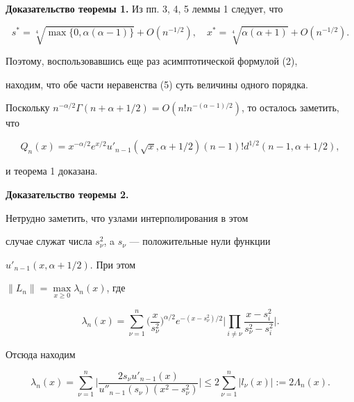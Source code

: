 {\bf Доказательство теоремы 1.} Из пп. 3, 4, 5 леммы 1 следует, что


$$


s^\ast=\sqrt[4]{\max\{0,\alpha(\alpha-1)\}}+O(n^{-1/2}),\quad


x^\ast=\sqrt[4]{\alpha(\alpha+1)}+O(n^{-1/2}).


$$


Поэтому, воспользовавшись еще раз асимптотической формулой (2),


находим, что обе части неравенства (5) суть величины одного порядка.


Поскольку $n^{-\alpha/2}\Gamma(n+\alpha+1/2)=


O(n!n^{-(\alpha-1)/2})$, то осталось заметить, что


$$


Q_n(x)=x^{-\alpha/2}e^{x/2}


u'_{n-1}(\sqrt x,\alpha+1/2)


(n-1)!d^{1/2}(n-1,\alpha+1/2),


$$


и теорема 1 доказана.


\medskip





{\bf Доказательство теоремы 2.}


Нетрудно заметить, что узлами интерполирования в этом 


случае служат числа $s^2_\nu$, a $s_\nu$ --- положительные нули функции


$u'_{n-1}(x,\alpha+1/2)$. При этом


$\| L_n\|=\max\limits_{x\geq0}\lambda_n(x)$, где


$$


\lambda_n(x)=\sum^n_{\nu=1}


\bigg(\frac{x}{s^2_\nu}\bigg)^{\alpha/2}e^{-(x-s^2_\nu)/2}


\bigg|\prod_{i\neq\nu}\frac{x-s^2_i}{s^2_\nu-s^2_i}\bigg|.


$$


Отсюда находим


$$


\lambda_n(x)=\sum^n_{\nu=1}


\bigg|\frac{2s_\nu u'_{n-1}(x)}


{u''_{n-1}(s_\nu)(x^2-s^2_\nu)}


\bigg|


\leq 2\sum^n_{\nu=1}|l_\nu(x)|:=2\Lambda_n(x). 


$$


